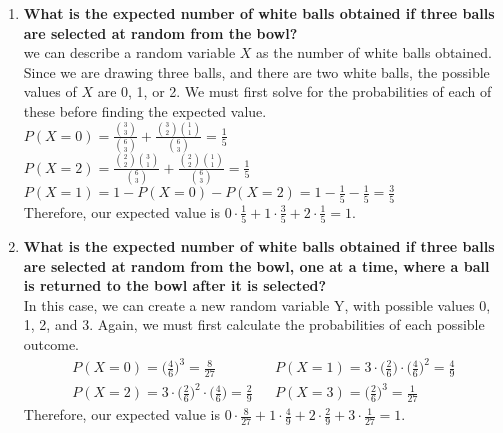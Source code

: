 \documentclass[10pt]{article}
\begin{document}
\begin{enumerate}[label=(\alph*)]
    \item \textbf{What is the expected number of white balls obtained if three balls are selected at random from the bowl?} \\
        we can describe a random variable $X$ as the number of white balls obtained.  Since we are drawing three balls, and there are two
        white balls, the possible values of $X$ are 0, 1, or 2.  We must first solve for the probabilities of each of these before finding the
        expected value. \\

        $P(X=0) = \frac{\binom33}{\binom63} + \frac{\binom32\binom11}{\binom63} = \frac15$ \\
        $P(X=2) = \frac{\binom22\binom31}{\binom63} + \frac{\binom22\binom11}{\binom63} = \frac15$ \\
        $P(X=1) = 1 - P(X=0) - P(X=2) = 1 - \frac15 - \frac15 = \frac35$ \\

        Therefore, our expected value is $0 \cdot \frac15 + 1 \cdot \frac35 + 2 \cdot \frac15 = 1$.

    \item \textbf{What is the expected number of white balls obtained if three balls are selected at random from the bowl, one at a 
        time, where a ball is returned to the bowl after it is selected?} \\
        In this case, we can create a new random variable Y, with possible values 0, 1, 2, and 3.  Again, we must first calculate the probabilities
        of each possible outcome. 
        \begin{align*}
            P(X=0) = \Big(\frac46\Big)^3 = \frac{8}{27} && P(X=1) = 3 \cdot \Big(\frac26\Big) \cdot \Big(\frac46\Big)^2 = \frac49 \\
            P(X=2) = 3 \cdot \Big(\frac26\Big)^2 \cdot \Big(\frac46\Big) = \frac29 && P(X=3) = \Big(\frac26\Big)^3 = \frac{1}{27}
        \end{align*}
        Therefore, our expected value is $0 \cdot \frac{8}{27} + 1 \cdot \frac49 + 2 \cdot \frac29 + 3 \cdot \frac{1}{27} = 1$.
\end{enumerate}
\end{document}

